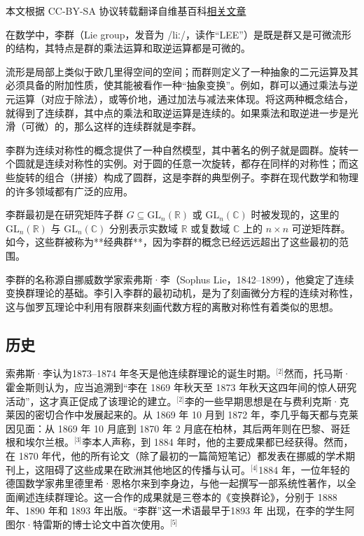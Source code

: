 
本文根据 CC-BY-SA 协议转载翻译自维基百科\href{https://en.wikipedia.org/wiki/Lie_group}{相关文章}

在数学中，李群（Lie group，发音为 /liː/，读作“LEE”）是既是群又是可微流形的结构，其特点是群的乘法运算和取逆运算都是可微的。

流形是局部上类似于欧几里得空间的空间；而群则定义了一种抽象的二元运算及其必须具备的附加性质，使其能被看作一种“抽象变换”。例如，群可以通过乘法与逆元运算（对应于除法），或等价地，通过加法与减法来体现。将这两种概念结合，就得到了连续群，其中点的乘法和取逆运算是连续的。如果乘法和取逆进一步是光滑（可微）的，那么这样的连续群就是李群。

李群为连续对称性的概念提供了一种自然模型，其中著名的例子就是圆群。旋转一个圆就是连续对称性的实例。对于圆的任意一次旋转，都存在同样的对称性；而这些旋转的组合（拼接）构成了圆群，这是李群的典型例子。李群在现代数学和物理的许多领域都有广泛的应用。

李群最初是在研究矩阵子群
$G \subseteq \mathrm{GL}_n(\mathbb{R})$ 或 $\mathrm{GL}_n(\mathbb{C})$ 时被发现的，这里的 $\mathrm{GL}_n(\mathbb{R})$ 与 $\mathrm{GL}_n(\mathbb{C})$ 分别表示实数域 $\mathbb{R}$ 或复数域 $\mathbb{C}$ 上的 $n \times n$ 可逆矩阵群。如今，这些群被称为**经典群**，因为李群的概念已经远远超出了这些最初的范围。

李群的名称源自挪威数学家索弗斯·李（Sophus Lie，1842–1899），他奠定了连续变换群理论的基础。李引入李群的最初动机，是为了刻画微分方程的连续对称性，这与伽罗瓦理论中利用有限群来刻画代数方程的离散对称性有着类似的思想。
\subsection{历史}
索弗斯·李认为1873–1874 年冬天是他连续群理论的诞生时期。\(^\text{[2]}\)然而，托马斯·霍金斯则认为，应当追溯到“李在 1869 年秋天至 1873 年秋天这四年间的惊人研究活动”，这才真正促成了该理论的建立。\(^\text{[2]}\)李的一些早期思想是在与费利克斯·克莱因的密切合作中发展起来的。从 1869 年 10 月到 1872 年，李几乎每天都与克莱因见面：从 1869 年 10 月底到 1870 年 2 月底在柏林，其后两年则在巴黎、哥廷根和埃尔兰根。\(^\text{[3]}\)李本人声称，到 1884 年时，他的主要成果都已经获得。然而，在 1870 年代，他的所有论文（除了最初的一篇简短笔记）都发表在挪威的学术期刊上，这阻碍了这些成果在欧洲其他地区的传播与认可。\(^\text{[4]}\)1884 年，一位年轻的德国数学家弗里德里希·恩格尔来到李身边，与他一起撰写一部系统性著作，以全面阐述连续群理论。这一合作的成果就是三卷本的《变换群论》，分别于 1888 年、1890 年和 1893 年出版。“李群”这一术语最早于1893 年 出现，在李的学生阿图尔·特雷斯的博士论文中首次使用。\(^\text{[5]}\)

